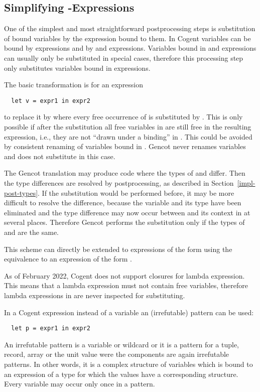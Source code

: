 \subsection{Simplifying -Expressions}
\label{impl-post-let}

One of the simplest and most straightforward postprocessing steps is substitution of bound variables by the
expression bound to them. In Cogent variables can be bound by  expressions and by  and 
expressions. Variables bound in  and  expressions can usually only be substituted in special cases, 
therefore this processing step only substitutes variables bound in  expressions. 

The basic transformation is for an expression
\begin{verbatim}
  let v = expr1 in expr2
\end{verbatim}
to replace it by  where every free occurrence of  is substituted by . This is only 
possible if after the substitution all free variables in  are still free in the resulting expression, i.e., 
they are not ``drawn under a binding'' in . This could be avoided by consistent renaming of variables bound in 
. Gencot never renames variables and does not substitute in this case.

The Gencot translation may produce code where the types of  and  differ. Then the type differences are
resolved by postprocessing, as described in Section~\ref{impl-post-types}. If the substitution would be performed before,
it may be more difficult to resolve the difference, because the variable and its type have been eliminated and the type
difference may now occur between  and its context in  at several places. Therefore Gencot performs
the substitution only if the types of  and  are the same.

This scheme can directly be extended to expressions of the form  using the
equivalence to an expression of the form .

As of February 2022, Cogent does not support closures for lambda expression. This means that a lambda expression must not
contain free variables, therefore lambda expressions in  are never inspected for substituting.

In a Cogent  expression instead of a variable  an (irrefutable) pattern  can be used:
\begin{verbatim}
  let p = expr1 in expr2
\end{verbatim}
An irrefutable pattern
is a variable or wildcard or it is a pattern for a tuple, record, array or the unit value were the components are again
irrefutable patterns. In other words, it is a complex structure of variables which is bound to an expression 
of a type for which the values have a corresponding structure. Every variable may occur only once in a pattern.

